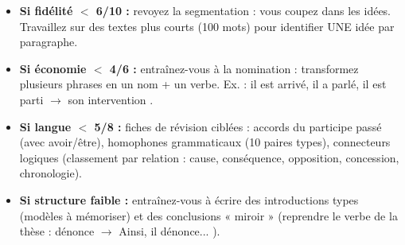\documentclass[11pt]{article}
\begin{document}
\begin{corrige}
\begin{itemize}
    \item \textbf{Si fidélité $<$ 6/10 :} revoyez la segmentation : vous coupez dans les idées. Travaillez sur des textes plus courts (100 mots) pour identifier UNE idée par paragraphe.
    \item \textbf{Si économie $<$ 4/6 :} entraînez-vous à la \og nomination \fg{} : transformez plusieurs phrases en un nom + un verbe. Ex. : \og il est arrivé, il a parlé, il est parti \fg{} $\rightarrow$ \og son intervention \fg{}.
    \item \textbf{Si langue $<$ 5/8 :} fiches de révision ciblées : accords du participe passé (avec avoir/être), homophones grammaticaux (10 paires types), connecteurs logiques (classement par relation : cause, conséquence, opposition, concession, chronologie).
    \item \textbf{Si structure faible :} entraînez-vous à écrire des introductions types (modèles à mémoriser) et des conclusions « miroir » (reprendre le verbe de la thèse : \og dénonce \fg{} $\rightarrow$ \og Ainsi, il dénonce... \fg{}).
\end{itemize}
\end{corrige}
\end{document}
